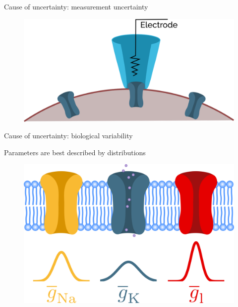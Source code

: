 \documentclass[presentation]{beamer}
\begin{document}
\begin{frame}{Cause of uncertainty: measurement uncertainty}

  \begin{figure}

    \includegraphics[height=0.9\textheight]{patch_clamp.png}
  \end{figure}

\end{frame}




\begin{frame}{Cause of uncertainty: biological variability}
  \begin{figure}
  \end{figure}

\end{frame}






\begin{frame}{Parameters are best described by distributions}
  \begin{figure}
    \includegraphics[width=1\textwidth]{distribution_channels.png}
  \end{figure}

\end{frame}
\end{document}
